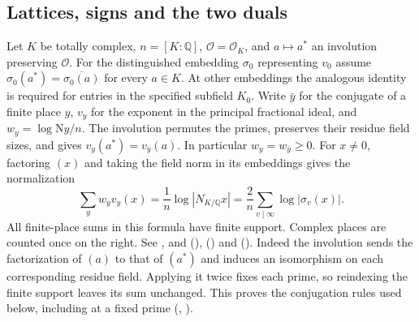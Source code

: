 
\subsection{Lattices, signs and the two duals}
Let $K$ be totally complex, $n=[K:\mathbb Q]$, $\mathcal O=\mathcal O_K$,
and $a\mapsto a^*$ an involution preserving $\mathcal O$. For the distinguished
embedding $\sigma_0$ representing $v_0$ assume
$\sigma_0(a^*)=\overline{\sigma_0(a)}$ for every $a\in K$.
At other embeddings the analogous identity is required for entries in the
specified subfield $K_0$. Write $\bar y$ for the conjugate of a finite
place $y$, $v_y$ for the exponent in the principal fractional ideal, and
$w_y=\log\mathrm N y/n$. The involution permutes the primes, preserves their
residue field sizes, and gives $v_y(a^*)=v_{\bar y}(a)$.
In particular $w_y=w_{\bar y}\ge0$. For $x\ne0$, factoring $(x)$ and taking
the field norm in its embeddings gives the normalization
\[
   \sum_y w_y v_y(x)=\frac{1}{n}\log|N_{K/\mathbb Q}x|
                  =\frac{2}{n}\sum_{v\mid\infty}\log|\sigma_v(x)|.
\]
All finite-place sums in this formula have finite support. Complex places
are counted once on the right.
See ,  and 
(),
 () and
 ().
Indeed the involution sends the factorization of $(a)$ to that of $(a^*)$
and induces an isomorphism on each corresponding residue field. Applying
it twice fixes each prime, so reindexing the finite support leaves its
sum unchanged. This proves the conjugation rules used below, including
at a fixed prime (, ).

